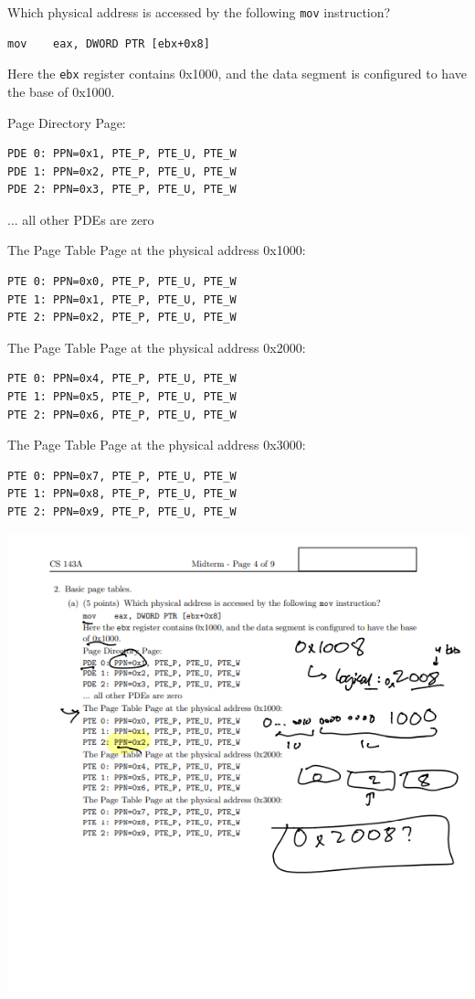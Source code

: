 \documentclass[11pt]{exam}
\begin{document}
\begin{questions}
\begin{parts}
	Which physical address is accessed by the following \texttt{mov} instruction? 
	
\begin{verbatim}
mov    eax, DWORD PTR [ebx+0x8]
\end{verbatim}

Here the \texttt{ebx} register contains 0x1000, and the 
data segment is configured to have the base of 0x1000. 

Page Directory Page:

\begin{verbatim}
PDE 0: PPN=0x1, PTE_P, PTE_U, PTE_W
PDE 1: PPN=0x2, PTE_P, PTE_U, PTE_W
PDE 2: PPN=0x3, PTE_P, PTE_U, PTE_W
\end{verbatim}

... all other PDEs are zero

The Page Table Page at the physical address 0x1000:

\begin{verbatim}
PTE 0: PPN=0x0, PTE_P, PTE_U, PTE_W
PTE 1: PPN=0x1, PTE_P, PTE_U, PTE_W
PTE 2: PPN=0x2, PTE_P, PTE_U, PTE_W
\end{verbatim}

The Page Table Page at the physical address 0x2000:

\begin{verbatim}
PTE 0: PPN=0x4, PTE_P, PTE_U, PTE_W
PTE 1: PPN=0x5, PTE_P, PTE_U, PTE_W
PTE 2: PPN=0x6, PTE_P, PTE_U, PTE_W
\end{verbatim}

The Page Table Page at the physical address 0x3000:

\begin{verbatim}
PTE 0: PPN=0x7, PTE_P, PTE_U, PTE_W
PTE 1: PPN=0x8, PTE_P, PTE_U, PTE_W
PTE 2: PPN=0x9, PTE_P, PTE_U, PTE_W
\end{verbatim}
\includegraphics[width=0.5\columnwidth]{figs/point-2a}
\newpage


\end{parts}
\end{questions}
\end{document}

